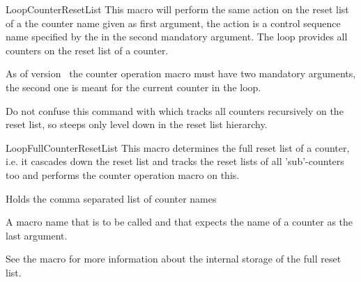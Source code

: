 \documentclass[12pt,a4paper,oneside]{article}
\makeatletter
\newcommand{\chdocextractversion}[1]{%
  \@nameuse{#1}%
}
\newcommand{\CHDocNew}[1]{%
  \tcbdocmarginnote[doclang/new={N},
  colframe=blue,
  halign=left,
  colback={blue!20!white},
  fontupper={\tiny}
  ]{%
    \chdocextractversion{xassoccntversion#1}%
  }%
}
\def\packageversion{\xassoccntpackageversion}%
\newcounter{foobar}
\makeatother
\begin{document}
\begin{dispExample}
   \newcommand{\showcountervalues}[2]{%
     \textcolor{#1}{\csname the#2\endcsname}%
     
   }
\end{dispExample}


\begin{docCommand}[before={\CHDocNew{1.4}}\par]{LoopCounterResetList}{}
This macro will perform the same action on the reset list of a the counter name given as first argument, the action is a control sequence name specified by the in the second mandatory argument. The loop provides all counters on the reset list of a counter. 

As of version \packageversion\ the counter operation macro must have two mandatory arguments, the second one is meant for the current counter in the loop. 

Do not confuse this command with  which tracks all counters recursively on the reset list, so  steeps  only level down in the reset list hierarchy.  
\end{docCommand}

\begin{docCommand}[before={\CHDocNew{1.0}}\par]{LoopFullCounterResetList}{} 
This macro determines the full reset list of a counter, i.e. it cascades down the reset list and tracks the reset lists of all 'sub'-counters too and performs the counter operation macro on this.  
\begin{codeoptionsenum}
  \item {}

    Holds the comma separated list of counter names
  \item {} 
    A macro name that is to be called and that expects the name of a counter as the last argument. 
  \end{codeoptionsenum}

See the macro  for more information about the internal storage of the full reset list. 

\end{docCommand}
\end{document}
